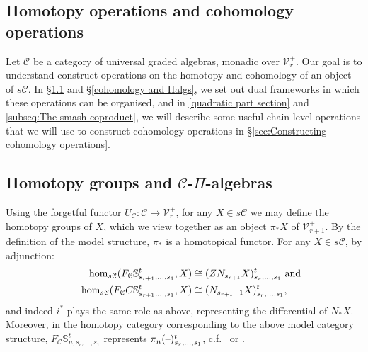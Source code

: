 \documentclass[11pt]{amsart}
\theoremstyle{plain}
\theoremstyle{definition}
\newcommand{\DASH}{\textup{--}}
\renewcommand{\to}{\longrightarrow}
\newcommand{\calC}{\mathcal{C}}
\newcommand{\calV}{\mathcal{V}}
\newcommand{\calc}{\mathcal{C}}
\theoremstyle{plain}
\newcommand{\vect}[2]{\calV^{#1}_{#2}}
\begin{document}
\begin{CPiAlgs and CHalgs}

\section{\textbf{Homotopy operations and cohomology operations}}
Let $\calC$ be a category of universal graded algebras, monadic over $\vect{+}{r}$. Our goal is to understand construct operations on the homotopy and cohomology of an object of $s\calC$. In \S\ref{homotopy and pialgs} and \S\ref{cohomology and Halgs}, we set out dual frameworks in which these operations can be organised, and in \ref{quadratic part section} and \ref{subseq:The smash coproduct}, we will describe some useful chain level operations that we will use to construct cohomology operations in \S\ref{sec:Constructing cohomology operations}.


\subsection{Homotopy groups and $\calC$-$\Pi$-algebras}\label{homotopy and pialgs}
Using the forgetful functor $U_\calC:\calc\to \vect{+}{r}$, for any $X\in s\calc$ we may define the homotopy groups of $X$,
which we view together as an object $\pi_*X$ of $\vect{+}{r+1}$. By the definition of the model structure, $\pi_*$ is a homotopical functor.
For any $X\in s\calC$, by adjunction:
\begin{alignat*}{2}
\hom_{s\calC}(F_\calC\mathbb{S}^t_{s_{r+1},\ldots,s_1},X)&\cong (ZN_{s_{r+1}}X)_{s_r,\ldots,s_1}^t\makebox[0cm][l]{ and}\\
\hom_{s\calC}(F_{\calC}C\mathbb{S}^t_{s_{r+1},\ldots,s_1},X)&\cong (N_{s_{r+1}+1}X)_{s_r,\ldots,s_1}^t,
\end{alignat*}
and indeed $i^*$ plays the same role as above, representing the differential of $N_*X$. Moreover, in the homotopy category corresponding to the above model category structure, $F_\calC\mathbb{S}^t_{n,s_r,\ldots,s_1}$ represents $\pi_n(\DASH)^t_{s_r,\ldots,s_1}$, c.f.\ \cite[\S1]{MR1089001} or \cite[\S3.1.1]{Blanc_Stover-Groth_SS.pdf}.


\end{CPiAlgs and CHalgs}
\end{document}
